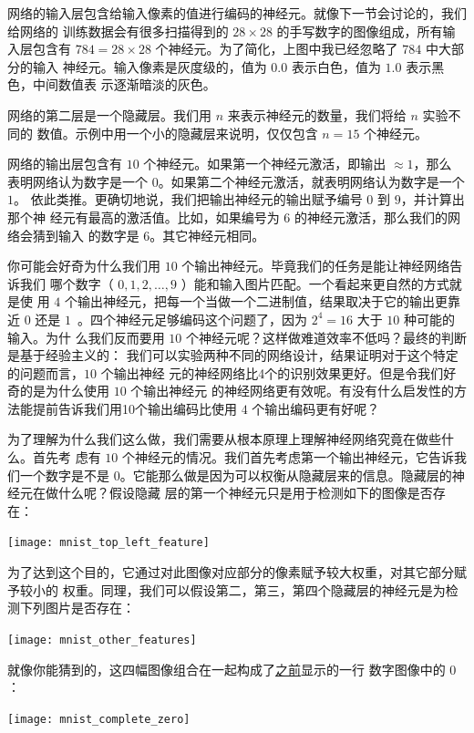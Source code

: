 网络的输入层包含给输入像素的值进行编码的神经元。就像下一节会讨论的，我们给网络的
训练数据会有很多扫描得到的 $28 \times 28$ 的手写数字的图像组成，所有输入层包含有
$784 = 28 \times 28$ 个神经元。为了简化，上图中我已经忽略了 $784$ 中大部分的输入
神经元。输入像素是灰度级的，值为 $0.0$ 表示白色，值为 $1.0$ 表示黑色，中间数值表
示逐渐暗淡的灰色。

网络的第二层是一个隐藏层。我们用 $n$ 来表示神经元的数量，我们将给 $n$ 实验不同的
数值。示例中用一个小的隐藏层来说明，仅仅包含 $n=15$ 个神经元。

网络的输出层包含有 $10$ 个神经元。如果第一个神经元激活，即输出 $\approx 1$，那么
表明网络认为数字是一个 $0$。如果第二个神经元激活，就表明网络认为数字是一个 $1$。
依此类推。更确切地说，我们把输出神经元的输出赋予编号 $0$ 到 $9$，并计算出那个神
经元有最高的激活值。比如，如果编号为 $6$ 的神经元激活，那么我们的网络会猜到输入
的数字是 $6$。其它神经元相同。

你可能会好奇为什么我们用 $10$ 个输出神经元。毕竟我们的任务是能让神经网络告诉我们
哪个数字（ $0, 1, 2, \ldots, 9$ ）能和输入图片匹配。一个看起来更自然的方式就是使
用 $4$ 个输出神经元，把每一个当做一个二进制值，结果取决于它的输出更靠近 $0$ 还是
$1$~。四个神经元足够编码这个问题了，因为 $2^4 = 16$ 大于 $10$ 种可能的输入。为什
么我们反而要用 $10$ 个神经元呢？这样做难道效率不低吗？最终的判断是基于经验主义的：
我们可以实验两种不同的网络设计，结果证明对于这个特定的问题而言，$10$ 个输出神经
元的神经网络比4个的识别效果更好。但是令我们好奇的是为什么使用 $10$ 个输出神经元
的神经网络更有效呢。有没有什么启发性的方法能提前告诉我们用10个输出编码比使用 $4$
个输出编码更有好呢？

为了理解为什么我们这么做，我们需要从根本原理上理解神经网络究竟在做些什么。首先考
虑有 $10$ 个神经元的情况。我们首先考虑第一个输出神经元，它告诉我们一个数字是不是
0。它能那么做是因为可以权衡从隐藏层来的信息。隐藏层的神经元在做什么呢？假设隐藏
层的第一个神经元只是用于检测如下的图像是否存在：
\begin{center}
  \texttt{[image: mnist\_top\_left\_feature]}
\end{center}

为了达到这个目的，它通过对此图像对应部分的像素赋予较大权重，对其它部分赋予较小的
权重。同理，我们可以假设第二，第三，第四个隐藏层的神经元是为检测下列图片是否存在：
\begin{center}
  \texttt{[image: mnist\_other\_features]}
\end{center}

就像你能猜到的，这四幅图像组合在一起构成了\hyperref[fig:digits]{之前}显示的一行
数字图像中的 $0$：
\begin{center}
  \texttt{[image: mnist\_complete\_zero]}
\end{center}

